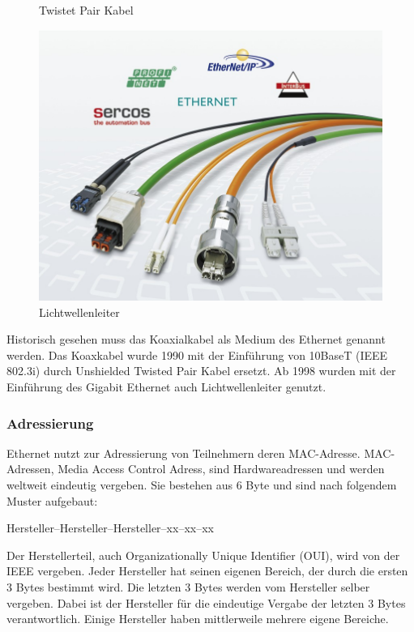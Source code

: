 \documentclass[12pt, a4paper, ngerman]{article}
\begin{document}
\begin{figure}[H]
\begin{minipage}[hbt]{.28\linewidth}
	\caption{Twistet Pair Kabel \cite{tw_kabel}}
	\label{twkabel}
\end{minipage}
\hfill
\begin{minipage}[hbt]{.28\linewidth}
	\centering
	\includegraphics[width=0.9\linewidth]{Grafiken/lwl_leiter.jpg}
	\caption{Lichtwellenleiter \cite{lwl_leiter}}
	\label{lwlleiter}
\end{minipage}
\end{figure}
 
Historisch gesehen muss das Koaxialkabel als Medium des Ethernet genannt werden. Das Koaxkabel wurde 1990 mit der Einführung von 10BaseT (IEEE 802.3i) durch Unshielded Twisted Pair Kabel ersetzt. Ab 1998 wurden mit der Einführung des Gigabit Ethernet auch Lichtwellenleiter genutzt. 

\subsubsection{Adressierung}
 Ethernet nutzt zur Adressierung von Teilnehmern deren MAC-Adresse. MAC-Adressen, Media Access Control Adress, sind Hardwareadressen und werden weltweit eindeutig vergeben. Sie bestehen aus 6 Byte und sind nach folgendem Muster aufgebaut: 
 
 Hersteller--Hersteller--Hersteller--xx--xx--xx 

Der Herstellerteil, auch Organizationally  Unique Identifier (OUI), wird von der IEEE vergeben. Jeder Hersteller hat seinen eigenen Bereich, der durch die ersten 3 Bytes bestimmt wird. Die letzten 3 Bytes werden vom Hersteller selber vergeben. Dabei ist der Hersteller für die eindeutige Vergabe der letzten 3 Bytes verantwortlich. Einige Hersteller haben mittlerweile mehrere eigene Bereiche.
\end{document}
